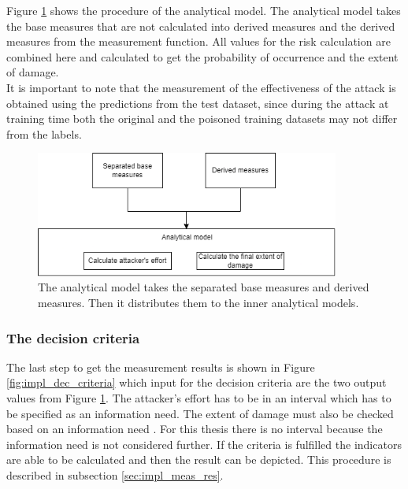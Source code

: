 Figure \ref{fig:impl_ana_mod} shows the procedure of the analytical model. The analytical model takes the base measures that are not calculated into derived measures and the derived measures from the measurement function. All values for the risk calculation are combined here and calculated to get the probability of occurrence and the extent of damage. \\ It is important to note that the measurement of the effectiveness of the attack is obtained using the predictions from the test dataset, since during the attack at training time both the original and the poisoned training datasets may not differ from the labels.

\begin{figure}[ht!]
  \centering
  \includegraphics[width=10cm]{pictures/impl_ana_mod.png}
  \caption{The analytical model takes the separated base measures and derived measures. Then it distributes them to the inner analytical models.}
  \label{fig:impl_ana_mod}
\end{figure}

\subsubsection*{The decision criteria}

The last step to get the measurement results is shown in Figure \ref{fig:impl_dec_criteria} which input for the decision criteria are the two output values from Figure \ref{fig:impl_ana_mod}. The attacker's effort has to be in an interval which has to be specified as an information need. The extent of damage must also be checked based on an information need \cite{ISO_27004_2009}. For this thesis there is no interval because the information need is not considered further. If the criteria is fulfilled the indicators are able to be calculated and then the result can be depicted. This procedure is described in subsection \ref{sec:impl_meas_res}.

